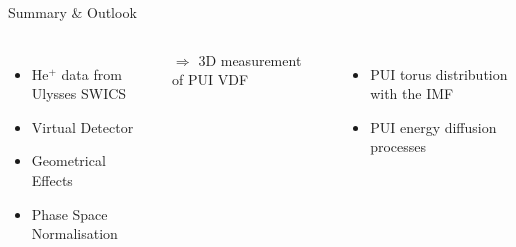 \documentclass{beamer}
\begin{document}
\begin{frame}[plain]{Summary \& Outlook}
\begin{columns}
	\column{8cm}
	\begin{itemize}
		\item $\mathrm{He^+}$ data from Ulysses SWICS
		\item Virtual Detector
		\item Geometrical Effects
		\item Phase Space Normalisation
	\end{itemize}
		\hspace{0.1cm}$\Rightarrow$ 3D measurement of PUI VDF
		\vspace{1cm}
		\hrule
		\vspace{1cm}
{\footnotesize	\begin{itemize}
		\item PUI torus distribution with the IMF
		\item PUI energy diffusion processes


\end{itemize}}
\end{columns}
\end{frame}
\end{document}
